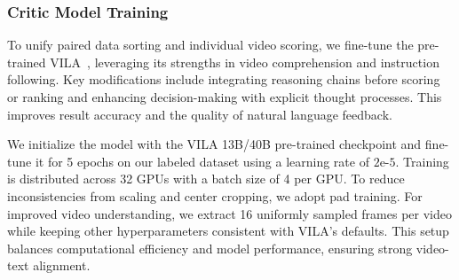 \subsubsection{Critic Model Training} \label{critic_training}
To unify paired data sorting and individual video scoring, we fine-tune the pre-trained VILA~\cite{lin2023vila}, leveraging its strengths in video comprehension and instruction following. Key modifications include integrating reasoning chains before scoring or ranking and enhancing decision-making with explicit thought processes. This improves result accuracy and the quality of natural language feedback.  

We initialize the model with the VILA 13B/40B pre-trained checkpoint and fine-tune it for 5 epochs on our labeled dataset using a learning rate of $2\text{e-}5$. Training is distributed across 32 GPUs with a batch size of 4 per GPU. To reduce inconsistencies from scaling and center cropping, we adopt pad training. For improved video understanding, we extract 16 uniformly sampled frames per video while keeping other hyperparameters consistent with VILA’s defaults. This setup balances computational efficiency and model performance, ensuring strong video-text alignment.  



